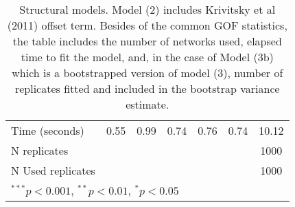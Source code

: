 \begin{table}[tb]
\begin{center}
\begin{tabular}{l c c c c c c }
$$Time (seconds)               & 0.55          & 0.99         & 0.74          & 0.76          & 0.74         & 10.12         \\
N replicates                 &               &              &               &               &              & 1000          \\
N Used replicates            &               &              &               &               &              & 1000          \\
\bottomrule
\multicolumn{7}{l}{\scriptsize{$^{***}p<0.001$, $^{**}p<0.01$, $^*p<0.05$}}
\end{tabular}
\normalsize 
\caption{Structural models. Model (2) includes Krivitsky et al (2011) offset term. Besides of the common GOF statistics, the table includes the number of networks used, elapsed time to fit the model, and, in the case of Model (3b) which is a bootstrapped version of model (3), number of replicates fitted and included in the bootstrap variance estimate.}
\label{tab:ci-ergm-baseline}
\end{center}
\end{table}
